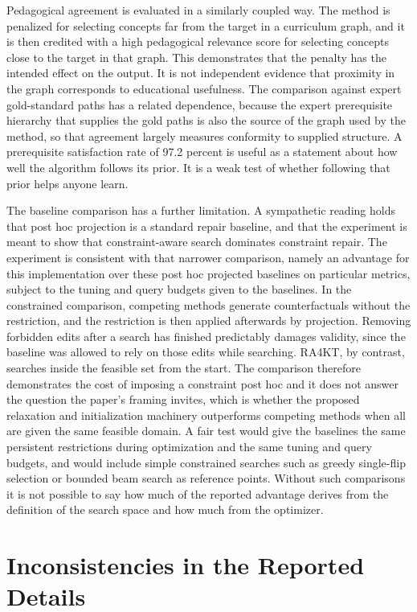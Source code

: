 \documentclass[11pt]{article}
\begin{document}
Pedagogical agreement is evaluated in a similarly coupled way. The method is penalized for selecting concepts far from the target in a curriculum graph, and it is then credited with a high pedagogical relevance score for selecting concepts close to the target in that graph. This demonstrates that the penalty has the intended effect on the output. It is not independent evidence that proximity in the graph corresponds to educational usefulness. The comparison against expert gold-standard paths has a related dependence, because the expert prerequisite hierarchy that supplies the gold paths is also the source of the graph used by the method, so that agreement largely measures conformity to supplied structure. A prerequisite satisfaction rate of 97.2 percent is useful as a statement about how well the algorithm follows its prior. It is a weak test of whether following that prior helps anyone learn.

The baseline comparison has a further limitation. A sympathetic reading holds that post hoc projection is a standard repair baseline, and that the experiment is meant to show that constraint-aware search dominates constraint repair. The experiment is consistent with that narrower comparison, namely an advantage for this implementation over these post hoc projected baselines on particular metrics, subject to the tuning and query budgets given to the baselines. In the constrained comparison, competing methods generate counterfactuals without the restriction, and the restriction is then applied afterwards by projection. Removing forbidden edits after a search has finished predictably damages validity, since the baseline was allowed to rely on those edits while searching. RA4KT, by contrast, searches inside the feasible set from the start. The comparison therefore demonstrates the cost of imposing a constraint post hoc and it does not answer the question the paper's framing invites, which is whether the proposed relaxation and initialization machinery outperforms competing methods when all are given the same feasible domain. A fair test would give the baselines the same persistent restrictions during optimization and the same tuning and query budgets, and would include simple constrained searches such as greedy single-flip selection or bounded beam search as reference points. Without such comparisons it is not possible to say how much of the reported advantage derives from the definition of the search space and how much from the optimizer.

\section{Inconsistencies in the Reported Details}
\end{document}

